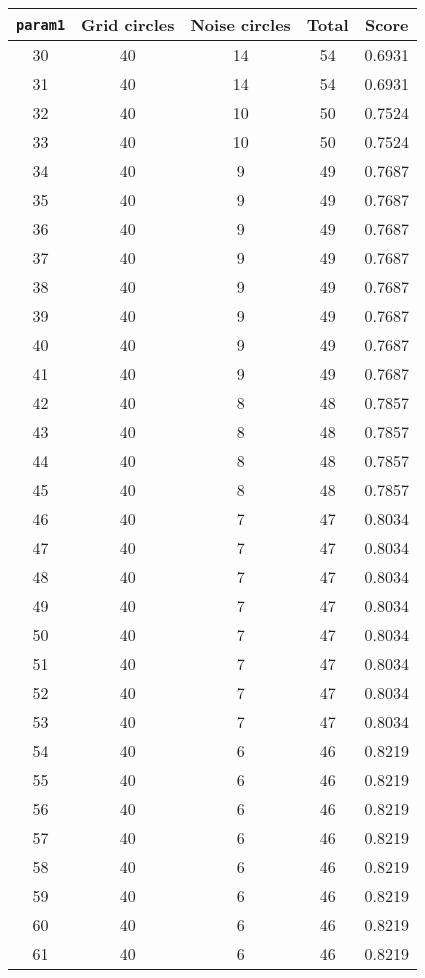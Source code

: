\documentclass[letterpaper, 12pt]{article}
\begin{document}
\begin{longtable}{|c|c|c|c|c|}
\hline
\textbf{\texttt{param1}} & \textbf{Grid circles} & \textbf{Noise circles} & \textbf{Total} & \textbf{Score} \\
\hline
30 & 40 & 14 & 54 & 0.6931 \\
\hline
31 & 40 & 14 & 54 & 0.6931 \\
\hline
32 & 40 & 10 & 50 & 0.7524 \\
\hline
33 & 40 & 10 & 50 & 0.7524 \\
\hline
34 & 40 & 9 & 49 & 0.7687 \\
\hline
35 & 40 & 9 & 49 & 0.7687 \\
\hline
36 & 40 & 9 & 49 & 0.7687 \\
\hline
37 & 40 & 9 & 49 & 0.7687 \\
\hline
38 & 40 & 9 & 49 & 0.7687 \\
\hline
39 & 40 & 9 & 49 & 0.7687 \\
\hline
40 & 40 & 9 & 49 & 0.7687 \\
\hline
41 & 40 & 9 & 49 & 0.7687 \\
\hline
42 & 40 & 8 & 48 & 0.7857 \\
\hline
43 & 40 & 8 & 48 & 0.7857 \\
\hline
44 & 40 & 8 & 48 & 0.7857 \\
\hline
45 & 40 & 8 & 48 & 0.7857 \\
\hline
46 & 40 & 7 & 47 & 0.8034 \\
\hline
47 & 40 & 7 & 47 & 0.8034 \\
\hline
48 & 40 & 7 & 47 & 0.8034 \\
\hline
49 & 40 & 7 & 47 & 0.8034 \\
\hline
50 & 40 & 7 & 47 & 0.8034 \\
\hline
51 & 40 & 7 & 47 & 0.8034 \\
\hline
52 & 40 & 7 & 47 & 0.8034 \\
\hline
53 & 40 & 7 & 47 & 0.8034 \\
\hline
54 & 40 & 6 & 46 & 0.8219 \\
\hline
55 & 40 & 6 & 46 & 0.8219 \\
\hline
56 & 40 & 6 & 46 & 0.8219 \\
\hline
57 & 40 & 6 & 46 & 0.8219 \\
\hline
58 & 40 & 6 & 46 & 0.8219 \\
\hline
59 & 40 & 6 & 46 & 0.8219 \\
\hline
60 & 40 & 6 & 46 & 0.8219 \\
\hline
61 & 40 & 6 & 46 & 0.8219 \\

\end{longtable}
\end{document}
